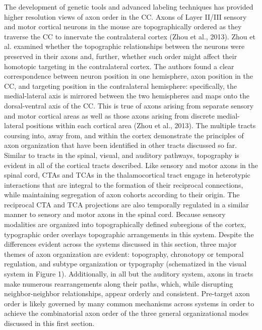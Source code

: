 The development of genetic tools and advanced labeling techniques has provided higher resolution views of axon order in the CC. Axons of Layer II/III sensory and motor cortical neurons in the mouse are topographically ordered as they traverse the CC to innervate the contralateral cortex (Zhou et al., 2013). Zhou et al. examined whether the topographic relationships between the neurons were preserved in their axons and, further, whether such order might affect their homotopic targeting in the contralateral cortex. The authors found a clear correspondence between neuron position in one hemisphere, axon position in the CC, and targeting position in the contralateral hemisphere: specifically, the medial-lateral axis is mirrored between the two hemispheres and maps onto the dorsal-ventral axis of the CC. This is true of axons arising from separate sensory and motor cortical areas as well as those axons arising from discrete medial-lateral positions within each cortical area (Zhou et al., 2013). 
The multiple tracts coursing into, away from, and within the cortex demonstrate the principles of axon organization that have been identified in other tracts discussed so far. Similar to tracts in the spinal, visual, and auditory pathways, topography is evident in all of the cortical tracts described. Like sensory and motor axons in the spinal cord, CTAs and TCAs in the thalamocortical tract engage in heterotypic interactions that are integral to the formation of their reciprocal connections, while maintaining segregation of axon cohorts according to their origin. The reciprocal CTA and TCA projections are also temporally regulated in a similar manner to sensory and motor axons in the spinal cord. Because sensory modalities are organized into topographically defined subregions of the cortex, typographic order overlays topographic arrangements in this system. 
Despite the differences evident across the systems discussed in this section, three major themes of axon organization are evident: topography, chronotopy or temporal regulation, and subtype organization or typography (schematized in the visual system in Figure 1). Additionally, in all but the auditory system, axons in tracts make numerous rearrangements along their paths, which, while disrupting neighbor-neighbor relationships, appear orderly and consistent. Pre-target axon order is likely governed by many common mechanisms across systems in order to achieve the combinatorial axon order of the three general organizational modes discussed in this first section. 
